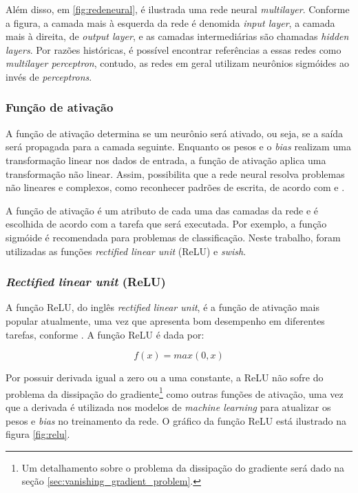 Além disso, em \ref{fig:redeneural}, é ilustrada uma rede neural \textit{multilayer}.
Conforme a figura, a camada mais à esquerda da rede é 
denomida \textit{input layer}, a camada mais à direita, de \textit{output layer},
e as camadas intermediárias são chamadas \textit{hidden layers}.
Por razões históricas, é possível encontrar referências a essas redes como
\textit{multilayer perceptron}, contudo, as redes em geral
utilizam neurônios sigmóides ao invés de \textit{perceptrons}.

\subsubsection{Função de ativação}
\label{sec:funcao_ativacao}

A função de ativação determina se um neurônio será ativado, ou seja, 
se a saída será propagada para a camada seguinte. Enquanto os pesos 
e o \textit{bias} realizam uma transformação linear nos dados 
de entrada, a função de ativação aplica uma transformação não
linear. Assim, possibilita que a rede neural resolva
problemas não lineares e complexos, como reconhecer padrões de 
escrita, de acordo com \citet{deeplearningbook} e \citet{zhang2021dive}. 

A função de ativação é um atributo de cada uma das camadas 
da rede e é escolhida de acordo com a tarefa que será 
executada. Por exemplo, a função sigmóide é recomendada
 para problemas de classificação. Neste trabalho, 
foram utilizadas as funções \textit{rectified linear unit} (ReLU) e \textit{swish}.

\subsubsection{\textit{Rectified linear unit} (ReLU)}

A função ReLU, do inglês \textit{rectified linear unit}, é a
função de ativação mais popular atualmente, uma vez que apresenta bom desempenho 
em diferentes tarefas, conforme \citet{dl-oreilly}. A função ReLU é dada por:

\begin{equation}
  f(x) = max(0,x)
\end{equation}

Por possuir derivada igual a zero ou a uma constante, a ReLU não sofre do problema da dissipação do gradiente\footnote{Um 
detalhamento sobre o problema da dissipação do gradiente será dado na seção \ref{sec:vanishing_gradient_problem}.} como
outras funções de ativação, 
uma vez que a derivada é utilizada nos modelos de \textit{machine learning}
para atualizar os pesos e \textit{bias} no treinamento da rede.
O gráfico da função ReLU está ilustrado na figura \ref{fig:relu}.


